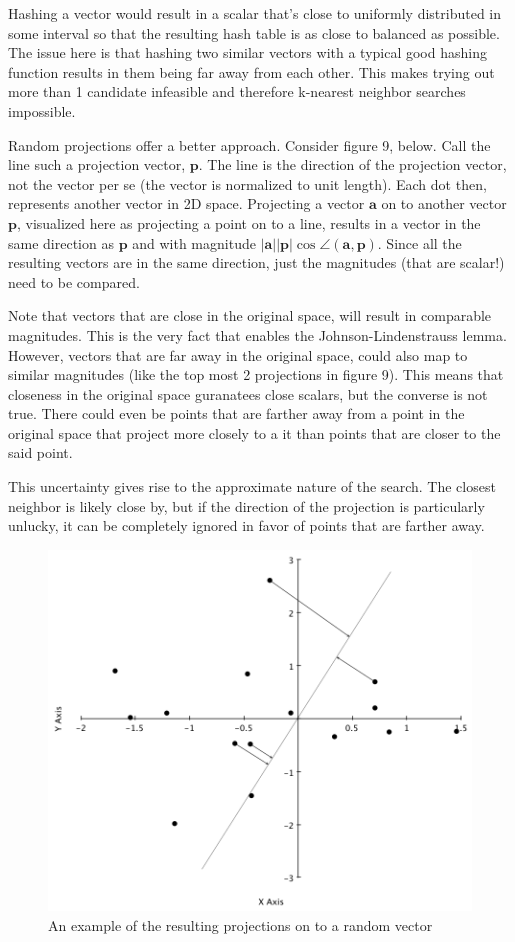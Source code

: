 \documentclass{article}
\begin{document}
Hashing a vector would result in a scalar that's close to uniformly distributed
in some interval so that the resulting hash table is as close to balanced as
possible. The issue here is that hashing two similar vectors with a typical
good hashing function results in them being far away from each other.
This makes trying out more than 1 candidate infeasible and therefore k-nearest
neighbor searches impossible.

Random projections offer a better approach. Consider figure 9, below.
Call the line such a projection vector, $\mathbf{p}$. The line is the direction
of the projection vector, not the vector per se (the vector is normalized to
unit length). Each dot then, represents another vector in 2D space.
Projecting a vector $\mathbf{a}$ on to another vector $\mathbf{p}$, visualized
here as projecting a point on to a line, results in a vector in the same
direction as $\mathbf{p}$ and with magnitude $|\mathbf{a}| |\mathbf{p}| \cos \angle(\mathbf{a}, \mathbf{p})$.
Since all the resulting vectors are in the same direction, just the magnitudes (that
are scalar!) need to be compared.

Note that vectors that are close in the original space, will result in comparable
magnitudes. This is the very fact that enables the Johnson-Lindenstrauss lemma.
However, vectors that are far away in the original space, could also map to similar
magnitudes (like the top most 2 projections in figure 9). This means that
closeness in the original space guranatees close scalars, but the converse is
not true.
There could even be points that are farther away from a point in the original space
that project more closely to a it than points that are closer to the said point.

This uncertainty gives rise to the approximate nature of the search. The
closest neighbor is likely close by, but if the direction of the projection is
particularly unlucky, it can be completely ignored in favor of points that are
farther away.

\begin{figure}[H]
    \caption{An example of the resulting projections on to a random vector}
    \includegraphics[scale=0.8]{proj.png}
\end{figure}
\end{document}
